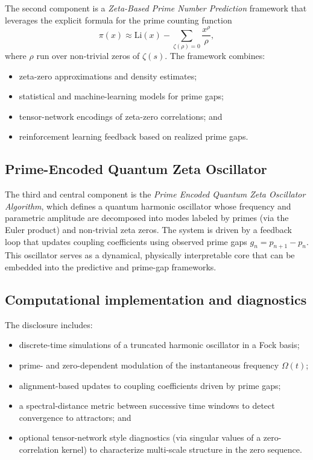 \documentclass[11pt]{article}
\begin{document}
The second component is a \emph{Zeta-Based Prime Number Prediction} framework that leverages the explicit formula for the prime counting function
\[
\pi(x) \approx \mathrm{Li}(x) - \sum_{\zeta(\rho)=0} \frac{x^{\rho}}{\rho},
\]
where $\rho$ run over non-trivial zeros of $\zeta(s)$.\cite{file2} The framework combines:
\begin{itemize}[nosep]
    \item zeta-zero approximations and density estimates;
    \item statistical and machine-learning models for prime gaps;
    \item tensor-network encodings of zeta-zero correlations; and
    \item reinforcement learning feedback based on realized prime gaps.\cite{file2}
\end{itemize}

\subsection{Prime-Encoded Quantum Zeta Oscillator}

The third and central component is the \emph{Prime Encoded Quantum Zeta Oscillator Algorithm}, which defines a quantum harmonic oscillator whose frequency and parametric amplitude are decomposed into modes labeled by primes (via the Euler product) and non-trivial zeta zeros.\cite{file3} The system is driven by a feedback loop that updates coupling coefficients using observed prime gaps $g_n = p_{n+1} - p_n$.\cite{file3} This oscillator serves as a dynamical, physically interpretable core that can be embedded into the predictive and prime-gap frameworks.

\subsection{Computational implementation and diagnostics}

The disclosure includes:
\begin{itemize}[nosep]
    \item discrete-time simulations of a truncated harmonic oscillator in a Fock basis;
    \item prime- and zero-dependent modulation of the instantaneous frequency $\Omega(t)$;
    \item alignment-based updates to coupling coefficients driven by prime gaps;
    \item a spectral-distance metric between successive time windows to detect convergence to attractors; and
    \item optional tensor-network style diagnostics (via singular values of a zero-correlation kernel) to characterize multi-scale structure in the zero sequence.
\end{itemize}
\end{document}
